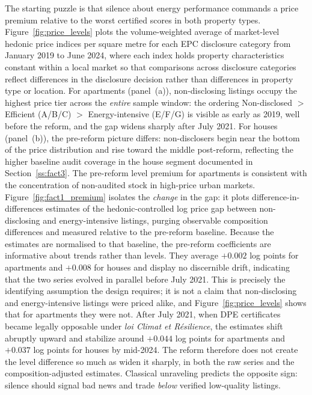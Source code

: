 \documentclass[10pt,letterpaper]{bp-template-concise}
\begin{document}
The starting puzzle is that silence about energy performance commands a price premium relative to the worst certified scores in both property types. Figure~\ref{fig:price_levels} plots the volume-weighted average of market-level hedonic price indices per square metre for each EPC disclosure category from January 2019 to June 2024, where each index holds property characteristics constant within a local market so that comparisons across disclosure categories reflect differences in the disclosure decision rather than differences in property type or location. For apartments (panel~(a)), non-disclosing listings occupy the highest price tier across the \emph{entire} sample window: the ordering Non-disclosed $>$ Efficient (A/B/C) $>$ Energy-intensive (E/F/G) is visible as early as 2019, well before the reform, and the gap widens sharply after July 2021. For houses (panel~(b)), the pre-reform picture differs: non-disclosers begin near the bottom of the price distribution and rise toward the middle post-reform, reflecting the higher baseline audit coverage in the house segment documented in Section~\ref{ss:fact3}. The pre-reform level premium for apartments is consistent with the concentration of non-audited stock in high-price urban markets. Figure~\ref{fig:fact1_premium} isolates the \emph{change} in the gap: it plots difference-in-differences estimates of the hedonic-controlled log price gap between non-disclosing and energy-intensive listings, purging observable composition differences and measured relative to the pre-reform baseline. Because the estimates are normalised to that baseline, the pre-reform coefficients are informative about trends rather than levels. They average $+0.002$ log points for apartments and $+0.008$ for houses and display no discernible drift, indicating that the two series evolved in parallel before July 2021. This is precisely the identifying assumption the design requires; it is not a claim that non-disclosing and energy-intensive listings were priced alike, and Figure~\ref{fig:price_levels} shows that for apartments they were not. After July 2021, when DPE certificates became legally opposable under \emph{loi Climat et R\'esilience}, the estimates shift abruptly upward and stabilize around $+0.044$ log points for apartments and $+0.037$ log points for houses by mid-2024. The reform therefore does not create the level difference so much as widen it sharply, in both the raw series and the composition-adjusted estimates. Classical unraveling predicts the opposite sign: silence should signal bad news and trade \emph{below} verified low-quality listings.
\end{document}
